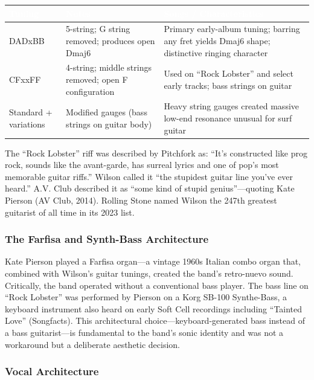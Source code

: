 \documentclass[11pt,letterpaper]{article}
\newcommand{\tableheader}[1]{\textbf{\sffamily\textcolor{white}{#1}}}
\begin{document}
\begin{center}
\begin{tabularx}{\textwidth}{L{2.5cm}L{3cm}X}
\toprule
{}
\tableheader{Tuning} & \tableheader{Notes} & \tableheader{Songs / Characteristics} \\
\midrule
DADxBB & 5-string; G string removed; produces open Dmaj6 & Primary early-album tuning; barring any fret yields Dmaj6 shape; distinctive ringing character \\
CFxxFF & 4-string; middle strings removed; open F configuration & Used on ``Rock Lobster'' and select early tracks; bass strings on guitar \\
Standard + variations & Modified gauges (bass strings on guitar body) & Heavy string gauges created massive low-end resonance unusual for surf guitar \\
\bottomrule
\end{tabularx}
\end{center}

The ``Rock Lobster'' riff was described by Pitchfork as: ``It's constructed like prog rock, sounds like the avant-garde, has surreal lyrics and one of pop's most memorable guitar riffs.'' Wilson called it ``the stupidest guitar line you've ever heard.'' A.V. Club described it as ``some kind of stupid genius''---quoting Kate Pierson (AV Club, 2014). Rolling Stone named Wilson the 247th greatest guitarist of all time in its 2023 list.

\subsubsection{The Farfisa and Synth-Bass Architecture}

Kate Pierson played a Farfisa organ---a vintage 1960s Italian combo organ that, combined with Wilson's guitar tunings, created the band's retro-nuevo sound. Critically, the band operated without a conventional bass player. The bass line on ``Rock Lobster'' was performed by Pierson on a Korg SB-100 Synthe-Bass, a keyboard instrument also heard on early Soft Cell recordings including ``Tainted Love'' (Songfacts). This architectural choice---keyboard-generated bass instead of a bass guitarist---is fundamental to the band's sonic identity and was not a workaround but a deliberate aesthetic decision.

\subsubsection{Vocal Architecture}
\end{document}
